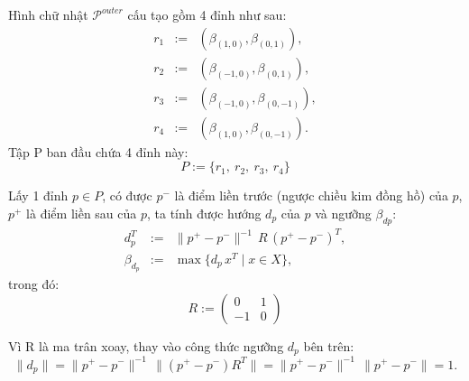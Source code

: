 \documentclass[11pt]{beamer}
\theoremstyle{definition}
\theoremstyle{plain}
\theoremstyle{plain}
\theoremstyle{remark}
\begin{document}
	\begin{frame}
		Hình chữ nhật $\mathcal{P}^{outer}$ cấu tạo gồm 4 đỉnh như sau:
		\begin{equation}\label{def_4r-1}
			\begin{array}{lcl}
				r_1 &:=& (\beta_{(1, 0)}, \beta_{(0, 1)}), \\
				r_2 &:=& (\beta_{(-1, 0)}, \beta_{(0, 1)}), \\
				r_3 &:=& (\beta_{(-1, 0)}, \beta_{(0, -1)}), \\
				r_4 &:=& (\beta_{(1, 0)}, \beta_{(0, -1)}).
			\end{array}
		\end{equation}
		Tập P ban đầu chứa 4 đỉnh này:\\
		\begin{equation}\label{def_4r-2}
			P := \{r_1,\ r_2,\ r_3,\ r_4\}
		\end{equation}
	\end{frame}
	\begin{frame}
		Lấy 1 đỉnh $p \in P$, có được $p^{-}$ là điểm liền trước (ngược chiều kim đồng hồ) của $p$, $p^{+}$ là điểm liền sau của $p$, ta tính được hướng $d_p$ của $p$ và ngưỡng $\beta_{dp}$:\\
		\begin{equation}\label{def_d_p}
			\begin{array}{lcl}
				d_{p}^T &:=& \|p^+ - p^-\|^{-1}\, R \, (p^+ - p^-)^T, \\
				\beta_{d_{p}} &:=& \max\{d_{p}\, x^T \mid x \in X\},
			\end{array}
		\end{equation}
		trong đó: 
		\begin{equation}\label{rotationmatrix}
			R := \begin{pmatrix}
				0 & 1 \\
				-1 & 0
			\end{pmatrix}
		\end{equation}
	\end{frame}
	\begin{frame}
		Vì R là ma trân xoay, thay vào công thức ngưỡng $d_p$ bên trên:
		\begin{equation}\label{def_d_p1}
			\|d_{p}\| = \|p^+ - p^-\|^{-1}\, \|(p^+ - p^-) R^T\| = \|p^+ - p^-\|^{-1}\, \|p^+ - p^-\| = 1.
		\end{equation}
	\end{frame}
	
\end{document}

